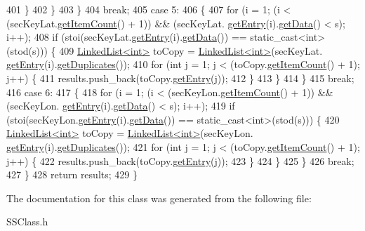 \begin{DoxyCode}
401             \}
402         \}
403     \}
404     \textcolor{keywordflow}{break};
405     \textcolor{keywordflow}{case} 5:
406     \{
407         \textcolor{keywordflow}{for} (i = 1; (i < (secKeyLat.\hyperlink{classLinkedList_afc6635f854f48f2f126cf3b60d845220}{getItemCount}() + 1)) && (secKeyLat.
      \hyperlink{classLinkedList_a341bfd7772c9d24d29eb7a7f3936915b}{getEntry}(i).\hyperlink{classSecKeySS_add52510d280d0ca89b653386500f08f5}{getData}() < s); i++);
408         \textcolor{keywordflow}{if} (stoi(secKeyLat.\hyperlink{classLinkedList_a341bfd7772c9d24d29eb7a7f3936915b}{getEntry}(i).\hyperlink{classSecKeySS_add52510d280d0ca89b653386500f08f5}{getData}()) == static\_cast<int>(stod(s))) \{
409             \hyperlink{classLinkedList}{LinkedList<int>} toCopy = \hyperlink{classLinkedList}{LinkedList<int>}(secKeyLat.
      \hyperlink{classLinkedList_a341bfd7772c9d24d29eb7a7f3936915b}{getEntry}(i).\hyperlink{classSecKeySS_aaae9db891cfcdc3f78d8a44145f4f08c}{getDuplicates}());
410             \textcolor{keywordflow}{for} (\textcolor{keywordtype}{int} j = 1; j < (toCopy.\hyperlink{classLinkedList_afc6635f854f48f2f126cf3b60d845220}{getItemCount}() + 1); j++) \{
411                 results.push\_back(toCopy.\hyperlink{classLinkedList_a341bfd7772c9d24d29eb7a7f3936915b}{getEntry}(j));
412             \}
413         \}
414     \}
415     \textcolor{keywordflow}{break};
416     \textcolor{keywordflow}{case} 6:
417     \{
418         \textcolor{keywordflow}{for} (i = 1; (i < (secKeyLon.\hyperlink{classLinkedList_afc6635f854f48f2f126cf3b60d845220}{getItemCount}() + 1)) && (secKeyLon.
      \hyperlink{classLinkedList_a341bfd7772c9d24d29eb7a7f3936915b}{getEntry}(i).\hyperlink{classSecKeySS_add52510d280d0ca89b653386500f08f5}{getData}() < s); i++);
419         \textcolor{keywordflow}{if} (stoi(secKeyLon.\hyperlink{classLinkedList_a341bfd7772c9d24d29eb7a7f3936915b}{getEntry}(i).\hyperlink{classSecKeySS_add52510d280d0ca89b653386500f08f5}{getData}()) == static\_cast<int>(stod(s))) \{
420             \hyperlink{classLinkedList}{LinkedList<int>} toCopy = \hyperlink{classLinkedList}{LinkedList<int>}(secKeyLon.
      \hyperlink{classLinkedList_a341bfd7772c9d24d29eb7a7f3936915b}{getEntry}(i).\hyperlink{classSecKeySS_aaae9db891cfcdc3f78d8a44145f4f08c}{getDuplicates}());
421             \textcolor{keywordflow}{for} (\textcolor{keywordtype}{int} j = 1; j < (toCopy.\hyperlink{classLinkedList_afc6635f854f48f2f126cf3b60d845220}{getItemCount}() + 1); j++) \{
422                 results.push\_back(toCopy.\hyperlink{classLinkedList_a341bfd7772c9d24d29eb7a7f3936915b}{getEntry}(j));
423             \}
424         \}
425     \}
426     \textcolor{keywordflow}{break};
427     \}
428     \textcolor{keywordflow}{return} results;
429 \}
\end{DoxyCode}


The documentation for this class was generated from the following file\+:\begin{DoxyCompactItemize}
\item 
S\+S\+Class.\+h\end{DoxyCompactItemize}
